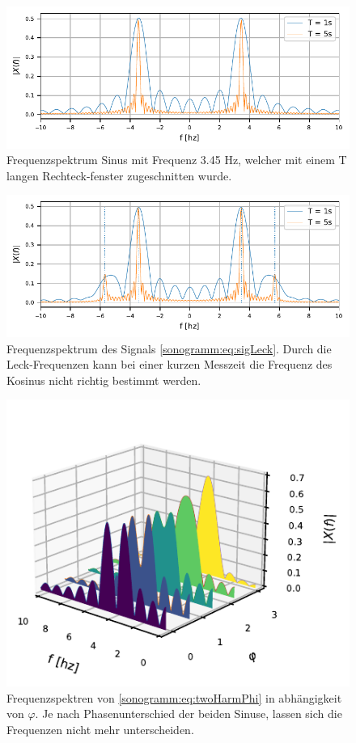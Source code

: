 \begin{figure}
    \centering
    \includegraphics{papers/sonogramm/images/RectWinHarmEx.pdf}
    \caption{Frequenzspektrum Sinus mit Frequenz 3.45 Hz, welcher mit einem T langen 
    Rechteck-fenster zugeschnitten wurde.
    \label{sonogramm:leakageDemo}
    }
\end{figure}

\begin{figure}
    \centering
    \includegraphics{papers/sonogramm/images/twohamrrect.pdf}
    \caption{Frequenzspektrum des Signals \eqref{sonogramm:eq:sigLeck}.
    Durch die Leck-Frequenzen kann bei einer kurzen Messzeit die Frequenz des Kosinus 
    nicht richtig bestimmt werden.
    \label{sonogramm:leakageDemo2}
    }
\end{figure}

\begin{figure}
    \centering
    \includegraphics{papers/sonogramm/images/twoharmphasedifff.pdf}
    \caption{Frequenzspektren von \eqref{sonogramm:eq:twoHarmPhi} in abhängigkeit von $\varphi$.
    Je nach Phasenunterschied der beiden Sinuse, lassen sich die Frequenzen nicht mehr unterscheiden.
    \label{sonogramm:freqdiffdemo}
    }
\end{figure}

